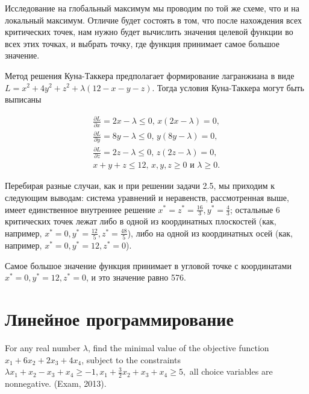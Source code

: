 \begin{solution}
Исследование на глобальный максимум мы проводим по той же схеме, что и на локальный максимум. Отличие будет состоять в том, что после нахождения всех критических точек, нам нужно будет вычислить значения целевой функции во всех этих точках, и выбрать точку, где функция принимает самое большое значение.

Метод решения Куна-Таккера предполагает формирование лагранжиана в виде $L=x^{2} +4y^{2} +z^{2} +\lambda (12-x-y-z)$. Тогда условия Куна-Таккера могут быть выписаны

\begin{align*}
\frac{\partial L}{\partial x} =2x-\lambda \le 0, \, x(2x-\lambda )=0, \\
\frac{\partial L}{\partial y} =8y-\lambda \le 0, \, y(8y-\lambda )=0, \\
\frac{\partial L}{\partial z} =2z-\lambda \le 0, \, z(2z-\lambda )=0,  \\
x+y+z\le 12, \, x,y,z\ge 0 \text{ и } \lambda \ge 0.
\end{align*}

Перебирая разные случаи, как и при решении задачи 2.5, мы приходим к следующим выводам: система уравнений и неравенств, рассмотренная выше, имеет единственное внутреннее решение $x^*=z^*=\frac{16}{3} , y^*=\frac{4}{3} $; остальные 6 критических точек лежат либо в одной из координатных плоскостей (как, например, $x^*=0, y^*=\frac{12}{5} , z^*=\frac{48}{5} $), либо на одной из координатных осей (как, например, $x^*=0, y^*=12, z^*=0$).

Самое большое значение функция принимает в угловой точке с координатами $x^*=0, y^*=12, z^*=0$, и это значение равно 576.
\end{solution}



\section{Линейное программирование}

\begin{problem}
For any real number $\lambda $, find the minimal value of the objective function $x_{1} +6x_{2} +2x_{3} +4x_{4} $, subject to the constraints $\lambda x_{1} +x_{2} -x_{3} +x_{4} \ge -1,  x_{1} +\frac{3}{2} x_{2} +x_{3} +x_{4} \ge 5,$ all choice variables are nonnegative. (Exam, 2013).
\end{problem}


